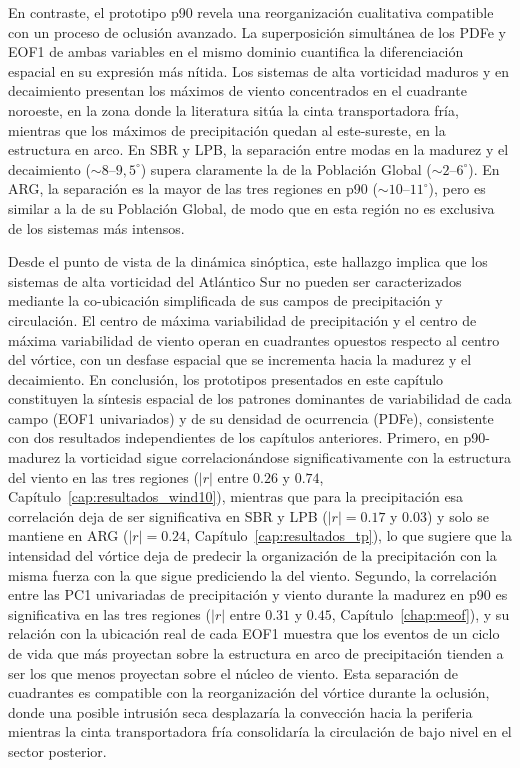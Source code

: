 En contraste, el prototipo p90 revela una reorganización cualitativa compatible con un proceso de oclusión avanzado. La superposición simultánea de los PDFe y EOF1 de ambas variables en el mismo dominio cuantifica la diferenciación espacial en su expresión más nítida. Los sistemas de alta vorticidad maduros y en decaimiento presentan los máximos de viento concentrados en el cuadrante noroeste, en la zona donde la literatura sitúa la cinta transportadora fría, mientras que los máximos de precipitación quedan al este-sureste, en la estructura en arco. En SBR y LPB, la separación entre modas en la madurez y el decaimiento (${\sim}8$--$9{,}5^{\circ}$) supera claramente la de la Población Global (${\sim}2$--$6^{\circ}$). En ARG, la separación es la mayor de las tres regiones en p90 (${\sim}10$--$11^{\circ}$), pero es similar a la de su Población Global, de modo que en esta región no es exclusiva de los sistemas más intensos.

Desde el punto de vista de la dinámica sinóptica, este hallazgo implica que los sistemas de alta vorticidad del Atlántico Sur no pueden ser caracterizados mediante la co-ubicación simplificada de sus campos de precipitación y circulación. El centro de máxima variabilidad de precipitación y el centro de máxima variabilidad de viento operan en cuadrantes opuestos respecto al centro del vórtice, con un desfase espacial que se incrementa hacia la madurez y el decaimiento. En conclusión, los prototipos presentados en este capítulo constituyen la síntesis espacial de los patrones dominantes de variabilidad de cada campo (EOF1 univariados) y de su densidad de ocurrencia (PDFe), consistente con dos resultados independientes de los capítulos anteriores. Primero, en p90-madurez la vorticidad sigue correlacionándose significativamente con la estructura del viento en las tres regiones ($|r|$ entre $0.26$ y $0.74$, Capítulo~\ref{cap:resultados_wind10}), mientras que para la precipitación esa correlación deja de ser significativa en SBR y LPB ($|r|=0.17$ y $0.03$) y solo se mantiene en ARG ($|r|=0.24$, Capítulo~\ref{cap:resultados_tp}), lo que sugiere que la intensidad del vórtice deja de predecir la organización de la precipitación con la misma fuerza con la que sigue prediciendo la del viento. Segundo, la correlación entre las PC1 univariadas de precipitación y viento durante la madurez en p90 es significativa en las tres regiones ($|r|$ entre $0.31$ y $0.45$, Capítulo~\ref{chap:meof}), y su relación con la ubicación real de cada EOF1 muestra que los eventos de un ciclo de vida que más proyectan sobre la estructura en arco de precipitación tienden a ser los que menos proyectan sobre el núcleo de viento. Esta separación de cuadrantes es compatible con la reorganización del vórtice durante la oclusión, donde una posible intrusión seca desplazaría la convección hacia la periferia mientras la cinta transportadora fría consolidaría la circulación de bajo nivel en el sector posterior.
